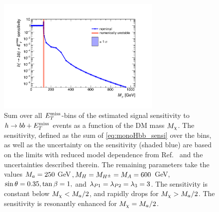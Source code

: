 \begin{figure}[tbp]
\centering
\includegraphics[width=0.7\textwidth]{texinputs/04_grid/figures/monoHbb_sensi_mDM_scan_red.pdf}
\caption[Sensitivity to $h\to bb + \MET$ signals with different $\mDM$, summed across $\MET$ bins]
{
Sum over all $\MET$-bins of the estimated signal sensitivity to $h\to bb + \MET$ events as a function of the DM mass $\mDM$. 
The sensitivity, defined as the sum of \autoref{eq:monoHbb_sensi} over the \met bins, as well as the uncertainty on the sensitivity (shaded blue) are based on the limits with reduced model dependence from Ref.~\cite{Aaboud:2017yqz} and the uncertainties described therein. 
The remaining parameters take the values $ M_{a} = 250 $ GeV$, M_{H}=M_{H^{\pm}}=M_{A} = 600$ GeV, $ \sin\theta = 0.35, \tan\beta = 1,$ and $ \lambda_{P1} = \lambda_{P2} = \lambda_{3} = 3 $. 
The sensitivity is constant below $M_{\chi} < M_{a}/2$, and rapidly drops for $M_{\chi} > M_{a}/2$. The sensitivity is resonantly enhanced for $M_{\chi} = M_{a}/2$.}
\label{fig:monoHbb_sensi_full_mDM}
\end{figure}

